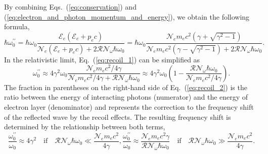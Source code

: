 \documentclass[10pt, a4paper, twoside, openright]{report}
\begin{document}
By combining Eqs.~(\ref{eq:conservation}) and (\ref{eq:electron_and_photon_momentum_and_energy}), we obtain the following formula,
\begin{equation}\label{eq:recoil_1}
\hbar \omega_0^{\prime \prime} = \hbar \omega_0 \frac{\mathcal{E}_e \left( \mathcal{E}_e + p_e c \right)}{\mathcal{N}_e \left( \mathcal{E}_e + p_e c \right) + 2 \mathcal{R} \mathcal{N}_{\omega} \hbar \omega_0} = \hbar \omega_0 \frac{\mathcal{N}_e m_e c^2 \left( \gamma + \sqrt{\gamma^2 - 1} \right)}{\mathcal{N}_e m_e c^2 \left( \gamma - \sqrt{\gamma^2 - 1} \right) + 2 \mathcal{R} \mathcal{N}_{\omega} \hbar \omega_0}.
\end{equation}
In the relativistic limit, Eq.~(\ref{eq:recoil_1}) can be simplified as
\begin{equation}\label{eq:recoil_2}
\omega_0^{\prime \prime} \approx 4 \gamma^2 \omega_0 \frac{\mathcal{N}_e m_e c^2 / 4 \gamma}{\mathcal{N}_e m_e c^2 / 4 \gamma + \mathcal{R} \mathcal{N}_{\omega} \hbar \omega_0} \approx 4 \gamma^2 \omega_0 \left( 1 - \frac{\mathcal{R} \mathcal{N}_{\omega} \hbar \omega_0}{\mathcal{N}_e m_e c^2 / 4 \gamma} \right).
\end{equation}
The fraction in parentheses on the right-hand side of Eq.~(\ref{eq:recoil_2}) is the ratio between the energy of interacting photons (numerator) and the energy of electron layer (denominator) and represents the correction to the frequency shift of the reflected wave by the recoil effects. The resulting frequency shift is determined by the relationship between both terms,
\begin{subequations}
\begin{equation}\label{eq:recoil_limit_1}
\frac{\omega_0^{\prime \prime}}{\omega_0} \approx 4 \gamma^2 \quad \mathrm{if} \quad \mathcal{R} \mathcal{N}_{\omega} \hbar \omega_0 \ll \frac{\mathcal{N}_e m_e c^2}{4 \gamma},
\end{equation}
\begin{equation}\label{eq:recoil_limit_2}
\frac{\omega_0^{\prime \prime}}{\omega_0} \approx \frac{\mathcal{N}_e m_e c^2 \gamma}{\mathcal{R} \mathcal{N}_{\omega} \hbar  \omega_0} \quad \mathrm{if} \quad \mathcal{R} \mathcal{N}_{\omega} \hbar \omega_0 \gg \frac{\mathcal{N}_e m_e c^2}{4 \gamma}. 
\end{equation}
\end{subequations}
\end{document}
